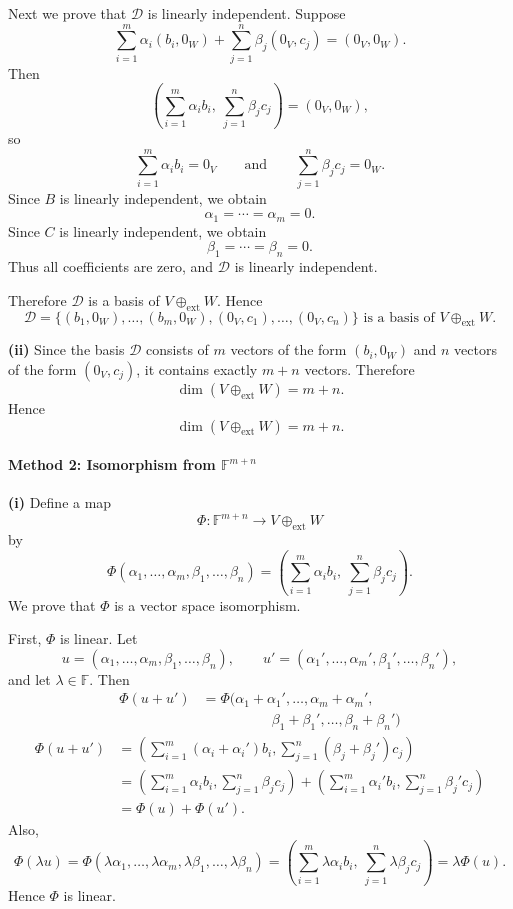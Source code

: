 \documentclass[12pt]{article}
\begin{document}
Next we prove that \(\mathcal D\) is linearly independent. Suppose
\[
\sum_{i=1}^m \alpha_i (b_i,0_W)+\sum_{j=1}^n \beta_j (0_V,c_j)=(0_V,0_W).
\]
Then
\[
\left(\sum_{i=1}^m \alpha_i b_i,\ \sum_{j=1}^n \beta_j c_j\right)=(0_V,0_W),
\]
so
\[
\sum_{i=1}^m \alpha_i b_i=0_V
\qquad\text{and}\qquad
\sum_{j=1}^n \beta_j c_j=0_W.
\]
Since \(B\) is linearly independent, we obtain
\[
\alpha_1=\cdots=\alpha_m=0.
\]
Since \(C\) is linearly independent, we obtain
\[
\beta_1=\cdots=\beta_n=0.
\]
Thus all coefficients are zero, and \(\mathcal D\) is linearly independent.

Therefore \(\mathcal D\) is a basis of \(V\oplus_{\mathrm{ext}}W\). Hence
\[
\boxed{\mathcal D=\{(b_1,0_W),\ldots,(b_m,0_W),(0_V,c_1),\ldots,(0_V,c_n)\}\text{ is a basis of }V\oplus_{\mathrm{ext}}W.}
\]

\noindent \noindent \textbf{(ii)} Since the basis \(\mathcal D\) consists of \(m\) vectors of the form \((b_i,0_W)\) and \(n\) vectors of the form \((0_V,c_j)\), it contains exactly \(m+n\) vectors. Therefore
\[
\dim(V\oplus_{\mathrm{ext}}W)=m+n.
\]
Hence
\[
\boxed{\dim(V\oplus_{\mathrm{ext}}W)=m+n.}
\]

\newpage
\paragraph{Method 2: Isomorphism from \(\mathbb F^{m+n}\)}

\noindent \textbf{(i)} Define a map
\[
\Phi:\mathbb F^{m+n}\to V\oplus_{\mathrm{ext}}W
\]
by
\[
\Phi(\alpha_1,\ldots,\alpha_m,\beta_1,\ldots,\beta_n)
=
\left(\sum_{i=1}^m \alpha_i b_i,\ \sum_{j=1}^n \beta_j c_j\right).
\]
We prove that \(\Phi\) is a vector space isomorphism.

First, \(\Phi\) is linear. Let
\[
u=(\alpha_1,\ldots,\alpha_m,\beta_1,\ldots,\beta_n),
\qquad
u'=(\alpha_1',\ldots,\alpha_m',\beta_1',\ldots,\beta_n'),
\]
and let \(\lambda\in\mathbb F\). Then
\[
\begin{aligned}
\Phi(u+u')
&=\Phi(\alpha_1+\alpha_1',\ldots,\alpha_m+\alpha_m',\\
&\hspace{5em}\beta_1+\beta_1',\ldots,\beta_n+\beta_n')
\end{aligned}
\]
\[
\begin{aligned}
\Phi(u+u')
&=\left(\sum_{i=1}^m (\alpha_i+\alpha_i')b_i,
\sum_{j=1}^n (\beta_j+\beta_j')c_j\right)\\
&=\left(\sum_{i=1}^m \alpha_i b_i,\sum_{j=1}^n \beta_j c_j\right)
+\left(\sum_{i=1}^m \alpha_i' b_i,\sum_{j=1}^n \beta_j' c_j\right)\\
&=\Phi(u)+\Phi(u').
\end{aligned}
\]
Also,
\[
\Phi(\lambda u)
=
\Phi(\lambda\alpha_1,\ldots,\lambda\alpha_m,\lambda\beta_1,\ldots,\lambda\beta_n)
=
\left(\sum_{i=1}^m \lambda\alpha_i b_i,\ \sum_{j=1}^n \lambda\beta_j c_j\right)
=
\lambda\Phi(u).
\]
Hence \(\Phi\) is linear.
\end{document}

